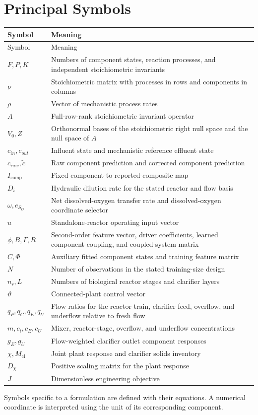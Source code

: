 \documentclass[12pt,twoside]{book}
\begin{document}
\chapter*{Principal Symbols}
\begin{longtable}{p{}p{}}
\toprule
Symbol & Meaning \\
\midrule
\endfirsthead
\toprule Symbol & Meaning \\
\midrule
\endhead
$F,P,K$ & Numbers of component states, reaction processes, and independent stoichiometric invariants \\
$\nu$ & Stoichiometric matrix with processes in rows and components in columns \\
$\rho$ & Vector of mechanistic process rates \\
$A$ & Full-row-rank stoichiometric invariant operator \\
$V_0,Z$ & Orthonormal bases of the stoichiometric right null space and the null space of $A$ \\
$c_{in},c_{out}$ & Influent state and mechanistic reference effluent state \\
$c_{raw},\widetilde c$ & Raw component prediction and corrected component prediction \\
$I_{\mathrm{comp}}$ & Fixed component-to-reported-composite map \\
$D_i$ & Hydraulic dilution rate for the stated reactor and flow basis \\
$\omega,e_{S_O}$ & Net dissolved-oxygen transfer rate and dissolved-oxygen coordinate selector \\
$u$ & Standalone-reactor operating input vector \\
$\phi,B,\Gamma,R$ & Second-order feature vector, driver coefficients, learned component coupling, and coupled-system matrix \\
$\widehat C,\Phi$ & Auxiliary fitted component states and training feature matrix \\
$N$ & Number of observations in the stated training-size design \\
$n_r,L$ & Numbers of biological reactor stages and clarifier layers \\
$\vartheta$ & Connected-plant control vector \\
$q_P,q_C,q_E,q_U$ & Flow ratios for the reactor train, clarifier feed, overflow, and underflow relative to fresh flow \\
$m,c_i,c_E,c_U$ & Mixer, reactor-stage, overflow, and underflow concentrations \\
$g_E,g_U$ & Flow-weighted clarifier outlet component responses \\
$\chi,M_{\mathrm{cl}}$ & Joint plant response and clarifier solids inventory \\
$D_\chi$ & Positive scaling matrix for the plant response \\
$J$ & Dimensionless engineering objective \\
\bottomrule
\end{longtable}
Symbols specific to a formulation are defined with their equations. A numerical coordinate is interpreted using the unit of its corresponding component.
\end{document}
